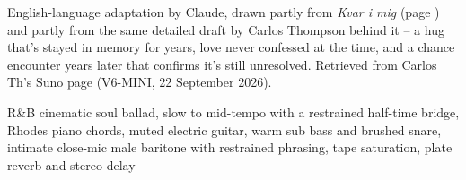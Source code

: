 
\begin{notes}
English-language adaptation by Claude, drawn partly from \emph{Kvar i mig} (page \pageref{sec:kvar-i-mig}) and partly from the same detailed draft by Carlos Thompson behind it -- a hug that's stayed in memory for years, love never confessed at the time, and a chance encounter years later that confirms it's still unresolved. Retrieved from Carlos Th's Suno page (V6-MINI, 22 September 2026).
\end{notes}
\begin{style}
R\&B cinematic soul ballad, slow to mid-tempo with a restrained half-time bridge, Rhodes piano chords, muted electric guitar, warm sub bass and brushed snare, intimate close-mic male baritone with restrained phrasing, tape saturation, plate reverb and stereo delay
\end{style}

